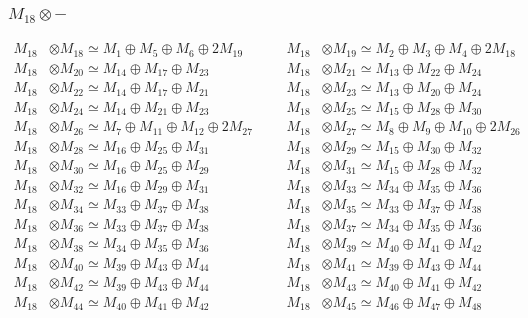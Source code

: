 \subsubsection{$ M_{18}\otimes -$}
\begin{align*}
M_{18} &\otimes M_{18} \simeq M_{1} \oplus M_{5} \oplus M_{6} \oplus 2M_{19} &&& M_{18} &\otimes M_{19} \simeq M_{2} \oplus M_{3} \oplus M_{4} \oplus 2M_{18}\\
M_{18} &\otimes M_{20} \simeq M_{14} \oplus M_{17} \oplus M_{23} &&& M_{18} &\otimes M_{21} \simeq M_{13} \oplus M_{22} \oplus M_{24}\\
M_{18} &\otimes M_{22} \simeq M_{14} \oplus M_{17} \oplus M_{21} &&& M_{18} &\otimes M_{23} \simeq M_{13} \oplus M_{20} \oplus M_{24}\\
M_{18} &\otimes M_{24} \simeq M_{14} \oplus M_{21} \oplus M_{23} &&& M_{18} &\otimes M_{25} \simeq M_{15} \oplus M_{28} \oplus M_{30}\\
M_{18} &\otimes M_{26} \simeq M_{7} \oplus M_{11} \oplus M_{12} \oplus 2M_{27} &&& M_{18} &\otimes M_{27} \simeq M_{8} \oplus M_{9} \oplus M_{10} \oplus 2M_{26}\\
M_{18} &\otimes M_{28} \simeq M_{16} \oplus M_{25} \oplus M_{31} &&& M_{18} &\otimes M_{29} \simeq M_{15} \oplus M_{30} \oplus M_{32}\\
M_{18} &\otimes M_{30} \simeq M_{16} \oplus M_{25} \oplus M_{29} &&& M_{18} &\otimes M_{31} \simeq M_{15} \oplus M_{28} \oplus M_{32}\\
M_{18} &\otimes M_{32} \simeq M_{16} \oplus M_{29} \oplus M_{31} &&& M_{18} &\otimes M_{33} \simeq M_{34} \oplus M_{35} \oplus M_{36}\\
M_{18} &\otimes M_{34} \simeq M_{33} \oplus M_{37} \oplus M_{38} &&& M_{18} &\otimes M_{35} \simeq M_{33} \oplus M_{37} \oplus M_{38}\\
M_{18} &\otimes M_{36} \simeq M_{33} \oplus M_{37} \oplus M_{38} &&& M_{18} &\otimes M_{37} \simeq M_{34} \oplus M_{35} \oplus M_{36}\\
M_{18} &\otimes M_{38} \simeq M_{34} \oplus M_{35} \oplus M_{36} &&& M_{18} &\otimes M_{39} \simeq M_{40} \oplus M_{41} \oplus M_{42}\\
M_{18} &\otimes M_{40} \simeq M_{39} \oplus M_{43} \oplus M_{44} &&& M_{18} &\otimes M_{41} \simeq M_{39} \oplus M_{43} \oplus M_{44}\\
M_{18} &\otimes M_{42} \simeq M_{39} \oplus M_{43} \oplus M_{44} &&& M_{18} &\otimes M_{43} \simeq M_{40} \oplus M_{41} \oplus M_{42}\\
M_{18} &\otimes M_{44} \simeq M_{40} \oplus M_{41} \oplus M_{42} &&& M_{18} &\otimes M_{45} \simeq M_{46} \oplus M_{47} \oplus M_{48}\\

\end{align*}
